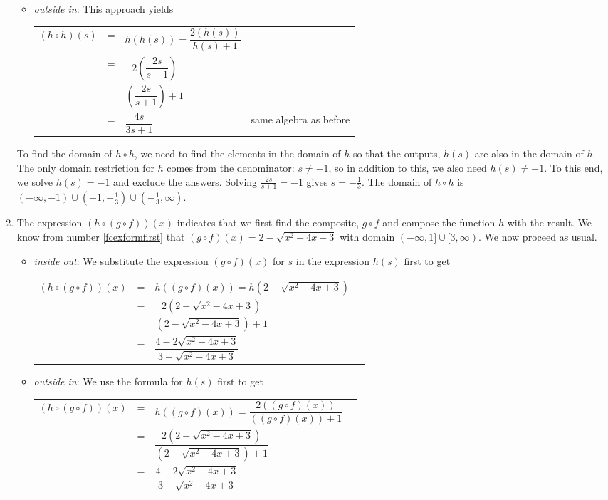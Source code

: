 \begin{ex}
\begin{enumerate}
\begin{itemize}
\item  \textit{outside in}: This approach yields
\begin{longtable}{rclr} $(h \circ h)(s)$ & = & $h(h(s)) = \dfrac{2 (h(s))}{h(s) + 1}$ & \\ [.25in]
& = & $\dfrac{2\left(\dfrac{2s}{s+1}\right)}{\left(\dfrac{2s}{s+1}\right)+1}$ & \\[.35in] 
& = & $\dfrac{4s}{3s+1}$ &  same algebra as before\\
 \end{longtable}

\end{itemize}

To find the domain of $h \circ h$,  we need to find the elements in the domain of $h$ so that the outputs, $h(s)$ are also in the domain of $h$.  The only domain restriction for $h$ comes from the denominator: $s \neq -1$, so in addition to this, we also need $h(s) \neq -1$.  To this end, we solve $h(s) = -1$ and exclude the answers.  Solving   $\frac{2s}{s+1} = -1$ gives $s = -\frac{1}{3}$.  The domain of $h \circ h$ is $(-\infty, -1) \cup \left(-1, -\frac{1}{3}\right) \cup \left(-\frac{1}{3}, \infty\right)$. 

\item  The expression $(h \circ (g \circ f))(x)$ indicates that we first find the composite, $g \circ f$ and compose the function $h$ with the result.  We know from number \ref{fcexformfirst} that $(g \circ f)(x) =  2 - \sqrt{x^2-4x+3}$ with domain $(-\infty, 1] \cup [3,\infty)$.  We now proceed as usual.

\begin{itemize}

\item  \textit{inside out}: We substitute the expression $(g \circ f)(x)$ for $s$ in the expression $h(s)$ first to get
\begin{longtable}{rclr} $(h \circ (g \circ f))(x)$ & = & $h((g \circ f)(x))=h\left(2 - \sqrt{x^2-4x+3}\right)$  & \\ [5pt]
 & = & $\dfrac{2 \left(2 - \sqrt{x^2-4x+3}\right)}{\left(2 - \sqrt{x^2-4x+3}\right)+1}$ & \\ [20pt]
 & = & $\dfrac{4 - 2\sqrt{x^2-4x+3}}{3 - \sqrt{x^2-4x+3}}$ & \\
 \end{longtable}

\item  \textit{outside in}:  We use the formula for $h(s)$ first to get
\begin{longtable}{rclr} $(h \circ (g \circ f))(x)$ & = & $h((g \circ f)(x))=\dfrac{2 \left( (g \circ f)(x)\right)}{  \left( (g \circ f)(x)\right) + 1}$  & \\ [15pt]
& = & $\dfrac{2 \left(2 - \sqrt{x^2-4x+3}\right)}{\left(2 - \sqrt{x^2-4x+3}\right)+1}$ & \\ [20pt]
 & = & $\dfrac{4 - 2\sqrt{x^2-4x+3}}{3 - \sqrt{x^2-4x+3}}$ & \\
 \end{longtable}
 

\end{itemize}
\end{enumerate}
\end{ex}
